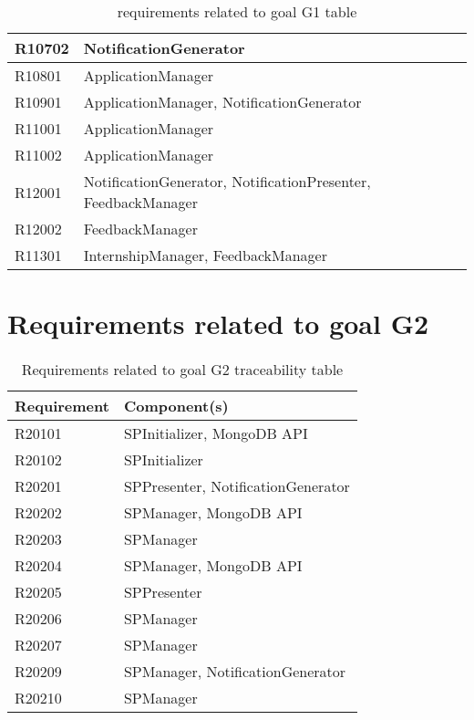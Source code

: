 \begin{table}[H]
\begin{tabular}{ | m{2.6cm} | m{9cm} | }
					\hline
						R10702 & NotificationGenerator \\
					\hline
						R10801 & ApplicationManager \\
					\hline
						R10901 & ApplicationManager, NotificationGenerator \\
					\hline
						R11001 & ApplicationManager \\
					\hline
						R11002 & ApplicationManager \\
					\hline
						R12001 & NotificationGenerator, NotificationPresenter, FeedbackManager \\
					\hline
						R12002 & FeedbackManager \\
					\hline 
						R11301 & InternshipManager, FeedbackManager \\
				\end{tabular}
				\caption{requirements related to goal G1 table}
			\end{table}
	\section{Requirements related to goal G2}
			\begin{table}[H]
				\begin{tabular}{ | m{2.6cm} | m{9cm} | } 
					\hline
					\textbf {Requirement} & \textbf{Component(s)} \\
					\hline
						R20101 & SPInitializer, MongoDB API \\
					\hline
						R20102 & SPInitializer \\
					\hline
						R20201 & SPPresenter, NotificationGenerator \\
					\hline
						R20202 & SPManager, MongoDB API \\
					\hline
						R20203 & SPManager \\
					\hline
						R20204 & SPManager, MongoDB API \\
					\hline
						R20205 & SPPresenter \\
					\hline
						R20206 & SPManager \\
					\hline
						R20207 & SPManager \\
					\hline
						R20209 & SPManager, NotificationGenerator \\
					\hline
						R20210 & SPManager \\
					\hline
				\end{tabular}
				\caption{Requirements related to goal G2 traceability table}
			\end{table}

